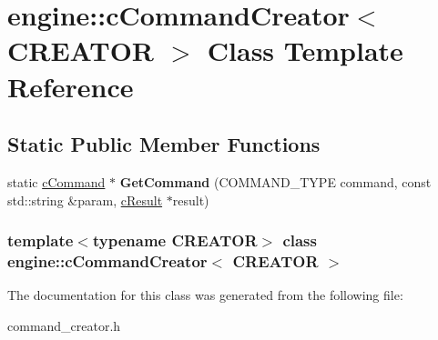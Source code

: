 \hypertarget{classengine_1_1cCommandCreator}{
\section{engine\-:\-:c\-Command\-Creator$<$ \-C\-R\-E\-A\-T\-O\-R $>$ \-Class \-Template \-Reference}
\label{classengine_1_1cCommandCreator}
}
\subsection*{\-Static \-Public \-Member \-Functions}
\begin{DoxyCompactItemize}
\item 
\hypertarget{classengine_1_1cCommandCreator_a37ff251d6e86ded9b9893cf66a635cd2}{
static \hyperlink{classengine_1_1cCommand}{c\-Command} $\ast$ {\bfseries \-Get\-Command} (\-C\-O\-M\-M\-A\-N\-D\-\_\-\-T\-Y\-P\-E command, const std\-::string \&param, \hyperlink{classengine_1_1cResult}{c\-Result} $\ast$result)}
\label{classengine_1_1cCommandCreator_a37ff251d6e86ded9b9893cf66a635cd2}

\end{DoxyCompactItemize}
\subsubsection*{template$<$typename C\-R\-E\-A\-T\-O\-R$>$ class engine\-::c\-Command\-Creator$<$ C\-R\-E\-A\-T\-O\-R $>$}



\-The documentation for this class was generated from the following file\-:\begin{DoxyCompactItemize}
\item 
command\-\_\-creator.\-h\end{DoxyCompactItemize}

